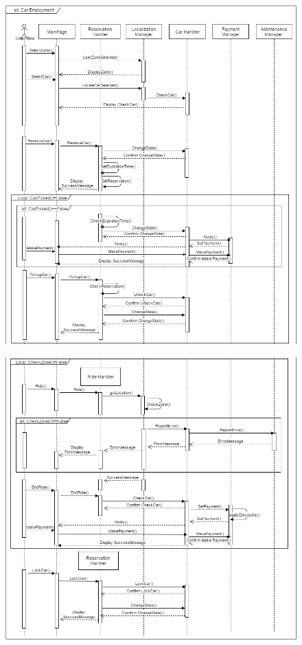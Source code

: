 		\begin{figure}[h]
			\includegraphics[scale=0.55]{img/CarEmploymentSD1.png}
		\end{figure}
		\newpage
		\begin{figure}[h]
			\includegraphics[scale=0.55]{img/CarEmploymentSD2.png}
		\end{figure}
		
